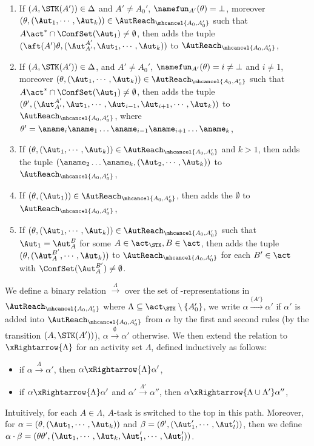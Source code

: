 \smallskip
\fbox
{
\begin{minipage}{0.9\textwidth}
\begin{enumerate}
    \item If $(A,\STK(A')) \in\Delta$ and $A'\neq A_0'$, $\namefun_{A'}(\theta) = \bot$, moreover $(\theta, (\Aut_1,\cdots,\Aut_k)) \in \AutReach_{\mhcancel{A_0,A_0'}}$ such that $A\act^*\cap\ConfSet(\Aut_1)\neq \emptyset$, 
        then adds the tuple $(\aft(A')\theta, (\Aut_{A'}^{A'},\Aut_1,\cdots,\Aut_k))$ to $\AutReach_{\mhcancel{A_0,A_0'}}$,
    \item If $(A,\STK(A')) \in\Delta$, and $A'\neq A_0'$, $\namefun_{A'}(\theta) = i \neq\bot$ and $i\neq 1$, moreover $(\theta, (\Aut_1,\cdots,\Aut_k)) \in \AutReach_{\mhcancel{A_0,A_0'}}$ such that $A\act^*\cap\ConfSet(\Aut_1)\neq \emptyset$, 
        then adds the tuple $(\theta', (\Aut_{A'}^{A'},\Aut_1,\cdots,\Aut_{i-1},\Aut_{i+1},\cdots,\Aut_{k}))$ to $\AutReach_{\mhcancel{A_0,A_0'}}$, where $\theta' = \aname_i\aname_1\dots\aname_{i-1}\aname_{i+1}\dots\aname_k$,
    \item If $(\theta, (\Aut_1,\cdots,\Aut_k)) \in \AutReach_{\mhcancel{A_0,A_0'}}$ and $k>1$, then adds the tuple $(\aname_2\dots\aname_k, (\Aut_2,\cdots,\Aut_k))$ to $\AutReach_{\mhcancel{A_0,A_0'}}$,
    \item If $(\theta, (\Aut_1)) \in \AutReach_{\mhcancel{A_0,A_0'}}$, then adds the $\emptyset$ to $\AutReach_{\mhcancel{A_0,A_0'}}$,
    \item If $(\theta, (\Aut_1,\cdots,\Aut_k)) \in \AutReach_{\mhcancel{A_0,A_0'}}$ such that $\Aut_1 = \Aut_A^B$ for some $A\in\act_{\STK},B\in\act$, then adds the tuple $(\theta, (\Aut_A^{B'},\cdots,\Aut_k))$ to $\AutReach_{\mhcancel{A_0,A_0'}}$ for each $B'\in\act$ with $\ConfSet(\Aut_A^{B'})\neq\emptyset$.
\end{enumerate}
\end{minipage}
}

We define a binary relation $\xrightarrow{\Lambda}$ over the set of {\WOTrNFA}-representations in $\AutReach_{\mhcancel{A_0,A_0'}}$ where $\Lambda\subseteq\act_{\STK}\setminus\{A_0'\}$, we write $\alpha\xrightarrow{\{A'\}}\alpha'$ if $\alpha'$ is added into $\AutReach_{\mhcancel{A_0,A_0'}}$ from $\alpha$ by the first and second rules (by the transition $(A,\STK(A'))$), $\alpha\xrightarrow{\emptyset}\alpha'$ otherwise.
We then extend the relation to $\xRightarrow{\Lambda}$ for an activity set $\Lambda$, defined inductively as follows:
\begin{itemize}
    \item if $\alpha\xrightarrow{\Lambda}\alpha'$, then $\alpha\xRightarrow{\Lambda}\alpha'$,
    \item if $\alpha\xRightarrow{\Lambda}\alpha'$ and $\alpha'\xrightarrow{\Lambda'}\alpha''$, then $\alpha\xRightarrow{\Lambda\cup\Lambda'}\alpha''$,
\end{itemize}
Intuitively, for each $A\in\Lambda$, $A$-task is switched to the top in this path. Moreover, for $\alpha = (\theta,(\Aut_1,\cdots,\Aut_k))$ and $\beta = (\theta',(\Aut_1',\cdots,\Aut_l'))$, then we define $\alpha\cdot\beta = (\theta\theta', (\Aut_1,\cdots,\Aut_k,\Aut_1',\cdots,\Aut_l'))$.

